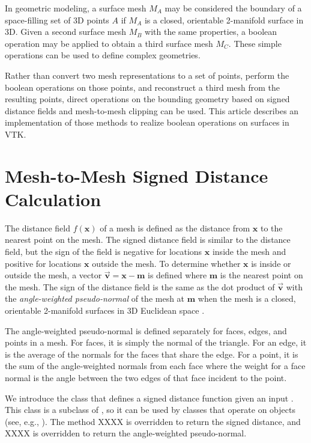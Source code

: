 \documentclass{InsightArticle}
\def\x{{\mathbf x}}
\def\m{{\mathbf m}}
\def\v{{\overrightarrow{\mathbf v}}}
\begin{document}
In geometric modeling, a surface mesh $M_A$ may be considered the boundary of a space-filling set of 3D points $A$ if $M_A$ is a closed, orientable 2-manifold surface in 3D. Given a second surface mesh $M_B$ with the same properties, a boolean operation may be applied to obtain a third surface mesh $M_C$. These simple operations can be used to define complex geometries.

Rather than convert two mesh representations to a set of points, perform the boolean operations on those points, and reconstruct a third mesh from the resulting points, direct operations on the bounding geometry based on signed distance fields and mesh-to-mesh clipping can be used. This article describes an implementation of those methods to realize boolean operations on surfaces in VTK.

\section{Mesh-to-Mesh Signed Distance Calculation}

The distance field $f(\x)$ of a mesh is defined as the distance from $\x$ to the nearest point on the mesh. The signed distance field is similar to the distance field, but the sign of the field is negative for locations $\x$ inside the mesh and positive for locations $\x$ outside the mesh. To determine whether $\x$ is inside or outside the mesh, a vector $\v = \x - \m$ is defined where $\m$ is the nearest point on the mesh. The sign of the distance field is the same as the dot product of $\v$ with the \emph{angle-weighted pseudo-normal} of the mesh at $\m$ when the mesh is a closed, orientable 2-manifold surfaces in 3D Euclidean space \cite{Baerentzen2005}.  

The angle-weighted pseudo-normal is defined separately for faces, edges, and points in a mesh. For faces, it is simply the normal of the triangle. For an edge, it is the average of the normals for the faces that share the edge. For a point, it is the sum of the angle-weighted normals from each face where the weight for a face normal is the angle between the two edges of that face incident to the point.

We introduce the  class that defines a signed distance function given an input . This class is a subclass of , so it can be used by classes that operate on  objects (see, e.g., ). The method XXXX is overridden to return the signed distance, and XXXX is overridden to return the angle-weighted pseudo-normal.
\end{document}
